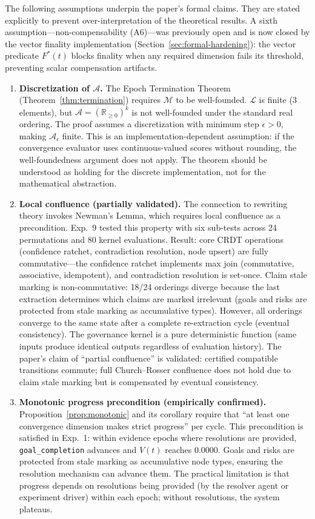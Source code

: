 \documentclass[11pt]{article}
\begin{document}
The following assumptions underpin the paper's formal claims. They are stated explicitly to prevent over-interpretation of the theoretical results. A sixth assumption---non-compensability (A6)---was previously open and is now closed by the vector finality implementation (Section~\ref{sec:formal-hardening}): the vector predicate $F^*(t)$ blocks finality when any required dimension fails its threshold, preventing scalar compensation artifacts.

\begin{enumerate}
  \item \textbf{Discretization of $\mathcal{A}$.} The Epoch Termination Theorem (Theorem~\ref{thm:termination}) requires $\mathcal{M}$ to be well-founded. $\mathcal{L}$ is finite (3 elements), but $\mathcal{A} = (\mathbb{R}_{\geq 0})^k$ is not well-founded under the standard real ordering. The proof assumes a discretization with minimum step $\epsilon > 0$, making $\mathcal{A}_\epsilon$ finite. This is an implementation-dependent assumption: if the convergence evaluator uses continuous-valued scores without rounding, the well-foundedness argument does not apply. The theorem should be understood as holding for the discrete implementation, not for the mathematical abstraction.

  \item \textbf{Local confluence (partially validated).} The connection to rewriting theory invokes Newman's Lemma, which requires local confluence as a precondition. Exp.~9 tested this property with six sub-tests across 24 permutations and 80 kernel evaluations. Result: core CRDT operations (confidence ratchet, contradiction resolution, node upsert) are fully commutative---the confidence ratchet implements max join (commutative, associative, idempotent), and contradiction resolution is set-once. Claim stale marking is non-commutative: 18/24 orderings diverge because the last extraction determines which claims are marked irrelevant (goals and risks are protected from stale marking as accumulative types). However, all orderings converge to the same state after a complete re-extraction cycle (eventual consistency). The governance kernel is a pure deterministic function (same inputs produce identical outputs regardless of evaluation history). The paper's claim of ``partial confluence'' is validated: certified compatible transitions commute; full Church--Rosser confluence does not hold due to claim stale marking but is compensated by eventual consistency.

  \item \textbf{Monotonic progress precondition (empirically confirmed).} Proposition~\ref{prop:monotonic} and its corollary require that ``at least one convergence dimension makes strict progress'' per cycle. This precondition is satisfied in Exp.~1: within evidence epochs where resolutions are provided, \texttt{goal\_completion} advances and $V(t)$ reaches 0.0000. Goals and risks are protected from stale marking as accumulative node types, ensuring the resolution mechanism can advance them. The practical limitation is that progress depends on resolutions being provided (by the resolver agent or experiment driver) within each epoch; without resolutions, the system plateaus.


\end{enumerate}
\end{document}
